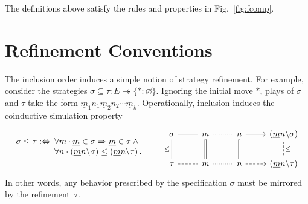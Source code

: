 \documentclass[acmsmall,screen,review,nonacm]{acmart}
\begin{document}
\begin{theorem} %
The definitions above satisfy the rules and properties
in Fig.~\ref{fig:fcomp}.
\end{theorem}




\section{Refinement Conventions} \label{sec:refconv} %


The inclusion order induces a simple notion of strategy refinement.
For example,
consider the strategies
$\sigma \subseteq \tau : E \twoheadrightarrow \{ {*} : \varnothing \}$.
Ignoring the initial move $*$,
plays of $\sigma$ and $\tau$ take the form
$
  \underline{m}_1 n_1 \underline{m}_2 n_2 \cdots \underline{m}_k
$.
Operationally,
inclusion induces the coinductive simulation property
\begin{equation} \label{eqn:sim}
  \begin{array}{r@{\:}l}
  \sigma \le \tau :\Leftrightarrow {} &
  \forall m \cdot
    \underline{m} \in \sigma \Rightarrow
    \underline{m} \in \tau \wedge {} \\ &
  \forall n \cdot
    (\underline{m} n \backslash \sigma) \le
    (\underline{m} n \backslash \tau)
  \,.
  \end{array}
  \qquad
  \begin{tikzcd}
    \sigma \ar[r,dash] \ar[d, dash, "\le"'] &
    m \ar[r,dotted,dash] \ar[d,equal] &
    n \ar[r] \ar[d,equal] &
    (\underline{m} n \backslash \sigma) \ar[d, dash, dashed, "\le"]
    \\
    \tau \ar[r,dash, dashed] &
    m \ar[r,dotted,dash] &
    n \ar[r,dashed] &
    (\underline{m} n \backslash \tau)
  \end{tikzcd}
\end{equation}
In other words,
any behavior prescribed by the specification $\sigma$
must be mirrored by the refinement~$\tau$.
\end{document}
